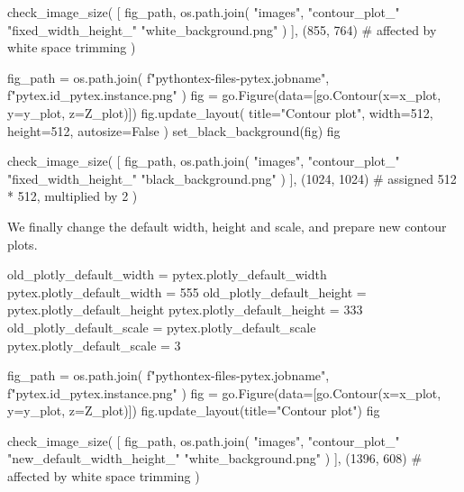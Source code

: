 \documentclass[oneside]{book}
\begin{document}
\begin{pycell}
check_image_size(
    [
        fig_path,
        os.path.join(
            "images",
            "contour_plot_"
            "fixed_width_height_"
            "white_background.png"
        )
    ],
    (855, 764)  # affected by white space trimming
)
\end{pycell}

\begin{pycell}
fig_path = os.path.join(
    f"pythontex-files-{pytex.jobname}",
    f"{pytex.id}_{pytex.instance}.png"
)
fig = go.Figure(data=[go.Contour(x=x_plot, y=y_plot, z=Z_plot)])
fig.update_layout(
    title="Contour plot", width=512, height=512, autosize=False
)
set_black_background(fig)
fig
\end{pycell}

\begin{pycell}
check_image_size(
    [
        fig_path,
        os.path.join(
            "images",
            "contour_plot_"
            "fixed_width_height_"
            "black_background.png"
        )
    ],
    (1024, 1024)  # assigned 512 * 512, multiplied by 2
)
\end{pycell}

\begin{mdcell}
We finally change the default width, height and scale, and prepare new contour plots.
\end{mdcell}

\begin{pycell}
old_plotly_default_width = pytex.plotly_default_width
pytex.plotly_default_width = 555
old_plotly_default_height = pytex.plotly_default_height
pytex.plotly_default_height = 333
old_plotly_default_scale = pytex.plotly_default_scale
pytex.plotly_default_scale = 3
\end{pycell}

\begin{pycell}
fig_path = os.path.join(
    f"pythontex-files-{pytex.jobname}",
    f"{pytex.id}_{pytex.instance}.png"
)
fig = go.Figure(data=[go.Contour(x=x_plot, y=y_plot, z=Z_plot)])
fig.update_layout(title="Contour plot")
fig
\end{pycell}

\begin{pycell}
check_image_size(
    [
        fig_path,
        os.path.join(
            "images",
            "contour_plot_"
            "new_default_width_height_"
            "white_background.png"
        )
    ],
    (1396, 608)  # affected by white space trimming
)
\end{pycell}
\end{document}
